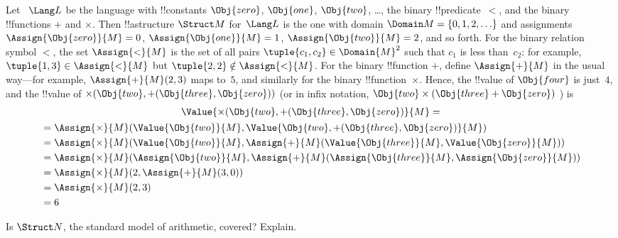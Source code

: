 \documentclass[../../../include/open-logic-section]{subfiles}
\begin{document}
\begin{ex}
Let ~$\Lang L$ be the language with !!{constant}s $\Obj{zero}$,
$\Obj{one}$, $\Obj{two}$, \dots, the binary !!{predicate}~$<$, and the
binary !!{function}s $+$ and $\times$. Then !!a{structure} $\Struct
M$ for~$\Lang L$ is the one with domain $\Domain M = \{0, 1, 2, \ldots
\}$ and assignments $\Assign{\Obj{zero}}{M} = 0$,
$\Assign{\Obj{one}}{M} = 1$, $\Assign{\Obj{two}}{M} = 2$, and so
forth. For the binary relation symbol $<$, the set $\Assign{<}{M}$ is
the set of all pairs $\tuple{c_1, c_2} \in \Domain{M}^2$ such that
$c_1$ is less than~$c_2$: for example, $\tuple{1, 3} \in
\Assign{<}{M}$ but $\tuple{2, 2} \notin \Assign{<}{M}$. For the binary
!!{function} $+$, define $\Assign{+}{M}$ in the usual way---for
example, $\Assign{+}{M}(2,3)$ maps to~$5$, and similarly for the
binary !!{function}~$\times$. Hence, the !!{value} of $\Obj{four}$ is
just~$4$, and the !!{value} of $\times(\Obj{two},
+(\Obj{three},\Obj{zero}))$ (or in infix notation, $\Obj{two} \times
(\Obj{three} + \Obj{zero})$ ) is
\begin{multline*}
\Value{\times(\Obj{two}, +(\Obj{three},\Obj{zero})}{M} =\\
\begin{aligned}
& =\Assign{\times}{M}(\Value{\Obj{two}}{M}, \Value{\Obj{two},
+(\Obj{three}, \Obj{zero})}{M})\\
& = \Assign{\times}{M}(\Value{\Obj{two}}{M}, \Assign{+}{M}(\Value{\Obj{three}}{M},
\Value{\Obj{zero}}{M})) \\
& = \Assign{\times}{M}(\Assign{\Obj{two}}{M}, \Assign{+}{M}(\Assign{\Obj{three}}{M},
\Assign{\Obj{zero}}{M})) \\
& = \Assign{\times}{M}(2, \Assign{+}{M}(3, 0)) \\
& = \Assign{\times}{M}(2, 3) \\
& = 6
\end{aligned}
\end{multline*}
\end{ex}

\begin{prob}
Is $\Struct N$, the standard model of arithmetic, covered? Explain.
\end{prob}
\end{document}

